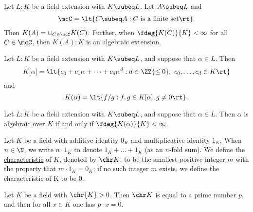 \documentclass[a4paper]{article}
\begin{document}
\begin{tproposition}
  Let \( L:K \) be a field extension with \( K\subeq L \).
  Let \( A\subeq L \) and \begin{align*}
    \mcC=\lt\{ C\subeq A : C \text{ is a finite set} \rt\}.
  \end{align*}
  Then \( K(A)=\cup_{C\in\mcC}K(C) \).
  Further, when \( \fdeg{K(C)}{K}<\infty \) for all \( C\in \mcC \), then \( K(A):K \) is an algebraic extension.
\end{tproposition}

\begin{tproposition}
  Let \( L : K \) be a field extension with \( K \subeq L \), and suppose that \( \alpha\in L \).
  Then \begin{align*}
    K[\alpha] = \lt\{ c_0 + c_1\alpha+\cdots+c_d \alpha^d : d\in \ZZ{\leq 0},\ c_0,\ldots,c_d\in K \rt\}
  \end{align*}
  and \begin{align*}
    K(\alpha) = \lt\{ f/g : f,g\in K[\alpha], g\neq 0 \rt\}.
  \end{align*}
\end{tproposition}

\begin{tproposition}
  Let \( L : K \) be a field extension with \( K \subeq L \), and suppose that \( \alpha\in L \).
  Then \( \alpha \) is algebraic over \( K \) if and only if \( \fdeg{K(\alpha)}{K}<\infty \).
\end{tproposition}

\begin{tdefinition}[Characteristic]
  Let \( K \) be a field with additive identity \( 0_K \) and multiplicative identity \( 1_K \).
  When \( n\in \N \), we write \( n\cdot 1_K \) to denote \( 1_K+\ldots+ 1_K \) (as an \( n \)-fold sum).
  We define the \ul{characteristic} of \( K \), denoted by \( \chr K \), to be the smallest positive integer \( m \) with the property that \( m\cdot 1_K = 0_K \);
  if no such integer \( m \) exists, we define the characteristic of K to be 0.
\end{tdefinition}

\begin{tproposition}
  Let \( K \) be a field with \( \chr{K} > 0 \). Then \( \chr K \) is equal to a prime number \( p \), and then for all \( x\in K \) one has \( p\cdot x=0 \).
\end{tproposition}
\end{document}
